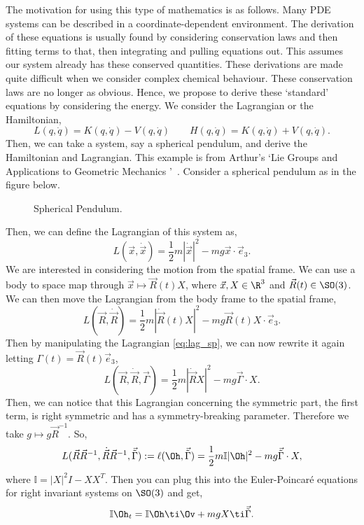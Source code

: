 \noindent
The motivation for using this type of mathematics is as follows. Many PDE systems can be described in a coordinate-dependent environment. The derivation of these equations is usually found by considering conservation laws and then fitting terms to that, then integrating and pulling equations out. This assumes our system already has these conserved quantities. These derivations are made quite difficult when we consider complex chemical behaviour. These conservation laws are no longer as obvious. Hence, we propose to derive these `standard' equations by considering the energy. We consider the Lagrangian or the Hamiltonian,
$$ L(q, \dot q) = K(q, \dot q) - V(q, \dot q) \qquad H(q, \dot q) = K(q, \dot q) + V(q, \dot q). $$
Then, we can take a system, say a spherical pendulum, and derive the Hamiltonian and Lagrangian. This example is from Arthur's `Lie Groups and Applications to Geometric Mechanics '~\cite {arthur}. Consider a spherical pendulum as in the figure below.

\begin{figure}[!ht]
\centering
\resizebox{0.6\textwidth}{!}{}
\caption{Spherical Pendulum.}
\label{fig:diffeos}
\end{figure}

Then, we can define the Lagrangian of this system as,
$$ L(\vec x, \dot{\vec x}) = \frac{1}{2}m|\dot {\vec x}|^2 - mg \vec x \cdot \vec e_3. $$
We are interested in considering the motion from the spatial frame. We can use a body to space map through $\vec x \mapsto \vec R(t)X$, where $\vec x, X \in \R^3$ and $\vec R(t) \in \SO(3)$. We can then move the Lagrangian from the body frame to the spatial frame,
\begin{equation}
  L(\vec R, \dot{\vec R}) = \frac{1}{2}m|\dot{\vec R}(t)X|^2 - mg \vec R(t)X \cdot \vec e_3.\label{eq:lag_sp}
\end{equation}
Then by manipulating the Lagrangian \eqref{eq:lag_sp}, we can now rewrite it again letting $\Gamma (t) = \vec R(t)\vec e_3$,
$$ L(\vec R, \dot{\vec R}, \vec\Gamma) = \frac{1}{2}m |\dot{\vec R}X|^2 - mg\vec\Gamma \cdot X. $$
Then, we can notice that this Lagrangian concerning the symmetric part, the first term, is right symmetric and has a symmetry-breaking parameter. Therefore we take $g \mapsto g\vec R^{-1}$. So,
$$ L(\vec R\vec R^{-1}, \dot{\vec R}\vec R^{-1}, \vec{\tilde{\Gamma}}) := \ell(\Oh, \vec{\tilde{\Gamma}}) = \frac{1}{2}m \mathbb{I} |\Oh|^2 - mg\vec{\tilde{\Gamma}} \cdot X, $$
where $\mathbb{I} = |X|^2I - XX^T$. Then you can plug this into the Euler-Poincar\'e equations for right invariant systems on $\SO(3)$ and get,
$$ \mathbb{I}\Oh_t = \mathbb{I}\Oh  \ti \Ov + mg X \ti \vec{\tilde{\Gamma}}. $$


